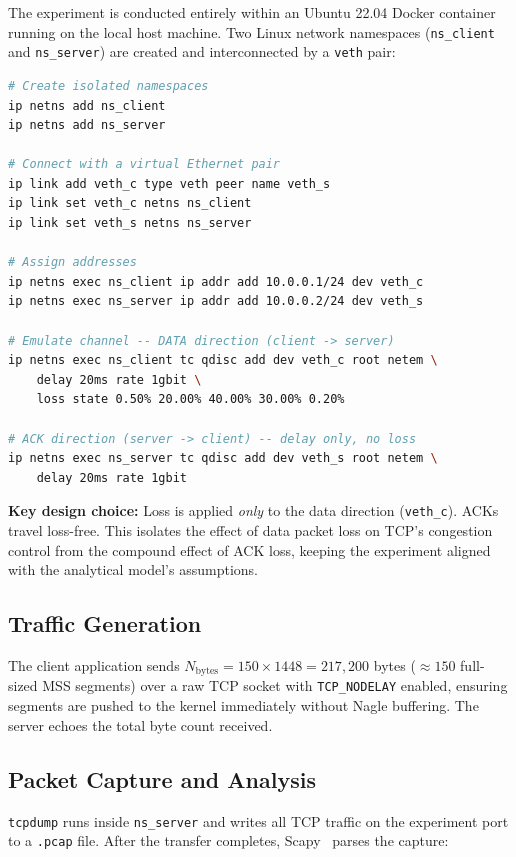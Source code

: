\documentclass[11pt,letterpaper]{article}
\begin{document}
The experiment is conducted entirely within an Ubuntu 22.04 Docker container
running on the local host machine.  Two Linux network namespaces
(\texttt{ns\_client} and \texttt{ns\_server}) are created and interconnected by
a \texttt{veth} pair:

\begin{lstlisting}[language=bash, caption={Network namespace and emulation setup.}]
# Create isolated namespaces
ip netns add ns_client
ip netns add ns_server

# Connect with a virtual Ethernet pair
ip link add veth_c type veth peer name veth_s
ip link set veth_c netns ns_client
ip link set veth_s netns ns_server

# Assign addresses
ip netns exec ns_client ip addr add 10.0.0.1/24 dev veth_c
ip netns exec ns_server ip addr add 10.0.0.2/24 dev veth_s

# Emulate channel -- DATA direction (client -> server)
ip netns exec ns_client tc qdisc add dev veth_c root netem \
    delay 20ms rate 1gbit \
    loss state 0.50% 20.00% 40.00% 30.00% 0.20%

# ACK direction (server -> client) -- delay only, no loss
ip netns exec ns_server tc qdisc add dev veth_s root netem \
    delay 20ms rate 1gbit
\end{lstlisting}

\textbf{Key design choice:} Loss is applied \emph{only} to the data direction
(\texttt{veth\_c}).  ACKs travel loss-free.  This isolates the effect of data
packet loss on TCP's congestion control from the compound effect of ACK loss,
keeping the experiment aligned with the analytical model's assumptions.

\subsection{Traffic Generation}

The client application sends $N_{\text{bytes}} = 150 \times 1448 = 217{,}200$
bytes ($\approx 150$ full-sized MSS segments) over a raw TCP socket with
\texttt{TCP\_NODELAY} enabled, ensuring segments are pushed to the kernel
immediately without Nagle buffering.  The server echoes the total byte count
received.

\subsection{Packet Capture and Analysis}

\texttt{tcpdump} runs inside \texttt{ns\_server} and writes all TCP traffic on
the experiment port to a \texttt{.pcap} file.  After the transfer completes,
Scapy~\cite{scapy} parses the capture:
\end{document}
